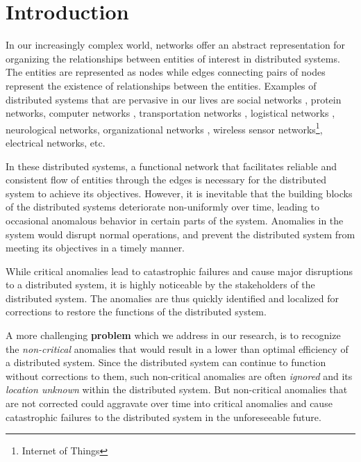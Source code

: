 \documentclass[conference]{IEEEtran.1.8}
\begin{document}
\section{Introduction}
\label{sec:intro}

In our increasingly complex world, networks offer an abstract representation for organizing the relationships between entities of interest in distributed systems. The entities are represented as nodes while edges connecting pairs of nodes represent the existence of relationships between the entities. Examples of distributed systems that are pervasive in our lives are social networks \cite{Wu2004}, protein networks, computer networks \cite{Kind2009, Sengar2009}, transportation networks \cite{Fadlil2013, Yuan2013}, logistical networks \cite{Agovic2009}, neurological networks, organizational networks \cite{Mihm2010}, wireless sensor networks\footnote{Internet of Things}, electrical networks, etc.

In these distributed systems, a functional network that facilitates reliable and consistent flow of entities through the edges is necessary for the distributed system to achieve its objectives. However, it is inevitable that the building blocks of the distributed systems deteriorate non-uniformly over time, leading to occasional anomalous behavior in certain parts of the system. Anomalies in the system would disrupt normal operations, and prevent the distributed system from meeting its objectives in a timely manner.

While critical anomalies lead to catastrophic failures and cause major disruptions to a distributed system, it is highly noticeable by the stakeholders of the distributed system. The anomalies are thus quickly identified and localized for corrections to restore the functions of the distributed system.

A more challenging \textbf{problem} which we address in our research, is to recognize the \emph{non-critical} anomalies that would result in a lower than optimal efficiency of a distributed system. Since the distributed system can continue to function without corrections to them, such non-critical anomalies are often \emph{ignored} and its \emph{location unknown} within the distributed system. But non-critical anomalies that are not corrected could aggravate over time into critical anomalies and cause catastrophic failures to the distributed system in the unforeseeable future. 
\end{document}
